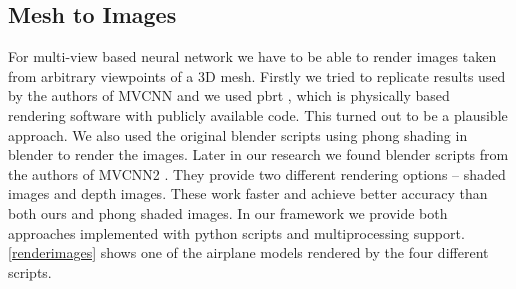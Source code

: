 \subsection{Mesh to Images}
\label{subsec:meshtoimgs}
For multi-view based neural network we have to be able to render images taken from arbitrary viewpoints of a 3D mesh. Firstly we tried to replicate results used by the authors of MVCNN \cite{su_multi-view_2015} and we used pbrt \cite{pharr_physically_2010}, which is physically based rendering software with publicly available code. This turned out to be a plausible approach. We also used the original blender scripts using phong shading \cite{bishop_fast_1986} in blender to render the images.
Later in our research we found blender scripts from the authors of MVCNN2 \cite{su_deeper_2018}. They provide two different rendering options -- shaded images and depth images. These work faster and achieve better accuracy than both ours and phong shaded images. In our framework we provide both approaches implemented with python scripts and multiprocessing support. \autoref{renderimages} shows one of the airplane models rendered by the four different scripts.

